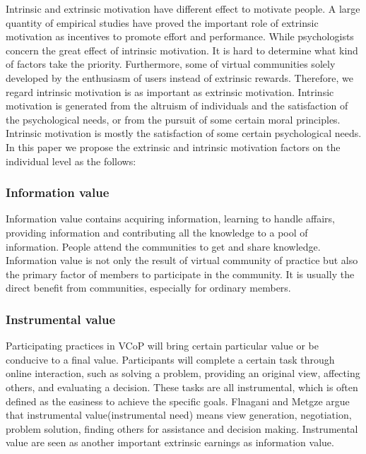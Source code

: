 \documentclass[doublespacing]{elsarticle}
\begin{document}
Intrinsic and extrinsic motivation have different effect to motivate people\cite{deci1985ima}. A large quantity of empirical studies have proved the important role
of extrinsic motivation as incentives to promote effort and
performance\cite{gibbons1998io}\cite{388530120001201}. While
psychologists concern the great effect of intrinsic
motivation\cite{bul-125-6-62719991101}\cite{wilson1981aas}. It is hard
to determine what kind of  factors
take the priority. Furthermore, some of virtual communities solely 
developed by the enthusiasm of users instead of extrinsic
rewards. Therefore, we regard intrinsic motivation is as important as extrinsic
motivation. Intrinsic motivation is generated from the altruism of
individuals and the satisfaction of the psychological needs, or from
the pursuit of some certain moral principles. Intrinsic motivation is
mostly the satisfaction of some certain psychological
needs\cite{josh_lerner_simple_2002}. In this paper we propose 
the extrinsic and intrinsic 
motivation factors on the individual level  as the
follows: 


\subsubsection{ Information value}

Information value contains acquiring
  information, learning to handle affairs, providing information and
  contributing all the knowledge to a pool of
  information\cite{flanagin2001internet}. People attend the
  communities to get and share knowledge\cite{dholakia2004241}. Information value is not only the result of
  virtual community of practice but also the primary factor of members
  to participate in the community. It is usually the direct benefit
  from communities, especially for ordinary members.   

  \subsubsection{Instrumental value}
\label{sec:instrumental-value}
  
Participating practices in VCoP will bring certain particular value or
be conducive to a final value\cite{Roennow-Rasmussen2002}. 
Participants will complete a certain task through
online interaction, such as solving a problem, providing an original
view, affecting others, and evaluating a decision. These tasks are all
instrumental, which is often defined as the easiness to achieve the
specific goals. Flnagani and Metgze argue that instrumental
value(instrumental need) means view generation, negotiation, problem
solution, finding others for assistance and decision
making\cite{flanagin2001internet}. Instrumental value are seen as
another important extrinsic earnings as information value\cite{dholakia2004241}.
\end{document}
